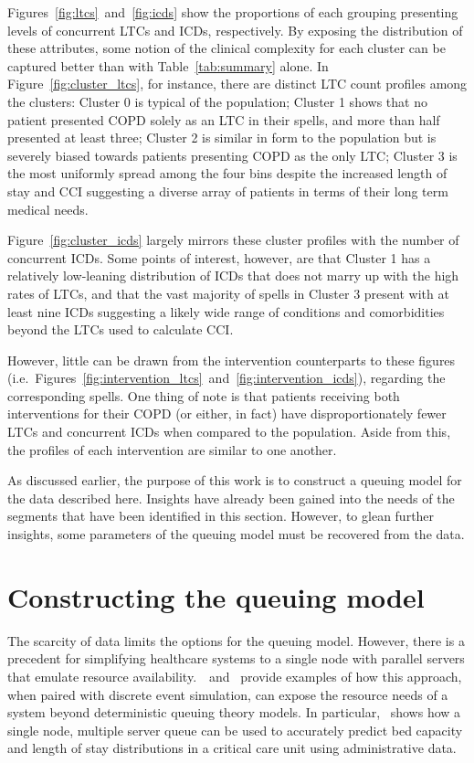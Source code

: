 Figures~\ref{fig:ltcs}~and~\ref{fig:icds} show the proportions of each grouping
presenting levels of concurrent LTCs and ICDs, respectively. By exposing the
distribution of these attributes, some notion of the clinical complexity for
each cluster can be captured better than with Table~\ref{tab:summary} alone. In
Figure~\ref{fig:cluster_ltcs}, for instance, there are distinct LTC count
profiles among the clusters: Cluster 0 is typical of the population; Cluster 1
shows that no patient presented COPD solely as an LTC in their spells, and more
than half presented at least three; Cluster 2 is similar in form to the
population but is severely biased towards patients presenting COPD as the only
LTC; Cluster 3 is the most uniformly spread among the four bins despite the
increased length of stay and CCI suggesting a diverse array of patients in
terms of their long term medical needs.

Figure~\ref{fig:cluster_icds} largely mirrors these cluster profiles with the
number of concurrent ICDs. Some points of interest, however, are that Cluster 1
has a relatively low-leaning distribution of ICDs that does not marry up with
the high rates of LTCs, and that the vast majority of spells in Cluster 3
present with at least nine ICDs suggesting a likely wide range of conditions and
comorbidities beyond the LTCs used to calculate CCI.\

However, little can be drawn from the intervention counterparts to these figures
(i.e.\ Figures~\ref{fig:intervention_ltcs}~and~\ref{fig:intervention_icds}),
regarding the corresponding spells. One thing of note is that patients receiving
both interventions for their COPD (or either, in fact) have disproportionately
fewer LTCs and concurrent ICDs when compared to the population. Aside from this,
the profiles of each intervention are similar to one another.

As discussed earlier, the purpose of this work is to construct a queuing model
for the data described here. Insights have already been gained into the needs of
the segments that have been identified in this section. However, to glean
further insights, some parameters of the queuing model must be recovered from
the data.

\section{Constructing the queuing model}\label{sec:model}

The scarcity of data limits the options for the queuing model. However, there is
a precedent for simplifying healthcare systems to a single node with parallel
servers that emulate resource
availability.~\cite{Steins2013}~and~\cite{Williams2015} provide examples of
how this approach, when paired with discrete event simulation, can expose the
resource needs of a system beyond deterministic queuing theory models. In
particular,~\cite{Williams2015} shows how a single node, multiple server queue
can be used to accurately predict bed capacity and length of stay distributions
in a critical care unit using administrative data.

